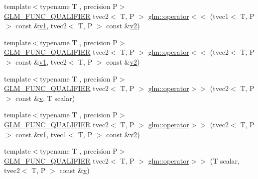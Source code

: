 \begin{DoxyCompactItemize}
\item 
{\footnotesize template$<$typename T , precision P$>$ }\\\mbox{\hyperlink{setup_8hpp_a33fdea6f91c5f834105f7415e2a64407}{G\+L\+M\+\_\+\+F\+U\+N\+C\+\_\+\+Q\+U\+A\+L\+I\+F\+I\+ER}} tvec2$<$ T, P $>$ \mbox{\hyperlink{namespaceglm_a205567dbacd363f1689f5210d3fe09a8}{glm\+::operator$<$$<$}} (tvec1$<$ T, P $>$ const \&\mbox{\hyperlink{glad_8h_a0779c3b73f9aa3a0ac5b0139b5d291d9}{v1}}, tvec2$<$ T, P $>$ const \&\mbox{\hyperlink{glad_8h_a9a09a1837922b2b806f4589096a52049}{v2}})
\item 
{\footnotesize template$<$typename T , precision P$>$ }\\\mbox{\hyperlink{setup_8hpp_a33fdea6f91c5f834105f7415e2a64407}{G\+L\+M\+\_\+\+F\+U\+N\+C\+\_\+\+Q\+U\+A\+L\+I\+F\+I\+ER}} tvec2$<$ T, P $>$ \mbox{\hyperlink{namespaceglm_acbd44aac9f345d300ed0479f10bdb50a}{glm\+::operator$<$$<$}} (tvec2$<$ T, P $>$ const \&\mbox{\hyperlink{glad_8h_a0779c3b73f9aa3a0ac5b0139b5d291d9}{v1}}, tvec2$<$ T, P $>$ const \&\mbox{\hyperlink{glad_8h_a9a09a1837922b2b806f4589096a52049}{v2}})
\item 
{\footnotesize template$<$typename T , precision P$>$ }\\\mbox{\hyperlink{setup_8hpp_a33fdea6f91c5f834105f7415e2a64407}{G\+L\+M\+\_\+\+F\+U\+N\+C\+\_\+\+Q\+U\+A\+L\+I\+F\+I\+ER}} tvec2$<$ T, P $>$ \mbox{\hyperlink{namespaceglm_aaa49c1189c99c7af0dc043fd6b77ec2b}{glm\+::operator$>$$>$}} (tvec2$<$ T, P $>$ const \&\mbox{\hyperlink{glad_8h_a14cfbe2fc2234f5504618905b69d1e06}{v}}, T scalar)
\item 
{\footnotesize template$<$typename T , precision P$>$ }\\\mbox{\hyperlink{setup_8hpp_a33fdea6f91c5f834105f7415e2a64407}{G\+L\+M\+\_\+\+F\+U\+N\+C\+\_\+\+Q\+U\+A\+L\+I\+F\+I\+ER}} tvec2$<$ T, P $>$ \mbox{\hyperlink{namespaceglm_a6a284bd63bcc073cdb5d57477472df2e}{glm\+::operator$>$$>$}} (tvec2$<$ T, P $>$ const \&\mbox{\hyperlink{glad_8h_a0779c3b73f9aa3a0ac5b0139b5d291d9}{v1}}, tvec1$<$ T, P $>$ const \&\mbox{\hyperlink{glad_8h_a9a09a1837922b2b806f4589096a52049}{v2}})
\item 
{\footnotesize template$<$typename T , precision P$>$ }\\\mbox{\hyperlink{setup_8hpp_a33fdea6f91c5f834105f7415e2a64407}{G\+L\+M\+\_\+\+F\+U\+N\+C\+\_\+\+Q\+U\+A\+L\+I\+F\+I\+ER}} tvec2$<$ T, P $>$ \mbox{\hyperlink{namespaceglm_aef087f228773e98e969469d85d015d3f}{glm\+::operator$>$$>$}} (T scalar, tvec2$<$ T, P $>$ const \&\mbox{\hyperlink{glad_8h_a14cfbe2fc2234f5504618905b69d1e06}{v}})

\end{DoxyCompactItemize}
